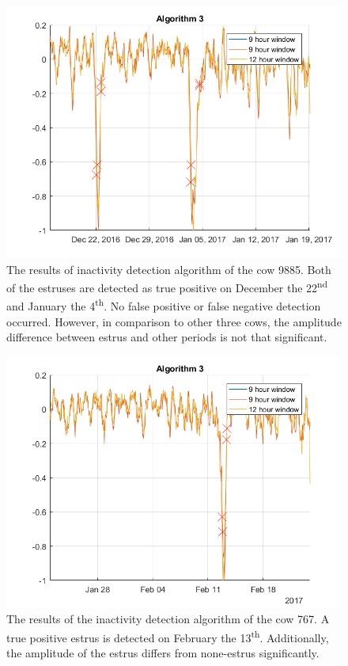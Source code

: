 \documentclass[english,12pt,a4paper,pdftex,elec,utf8]{aaltothesis}
\begin{document}
\begin{figure}[htb]
\centering
\includegraphics[width = 0.75 \textwidth]{figures/algorithm3_cow9885.png}
\caption{The results of inactivity detection algorithm of the cow 9885. Both of the estruses are detected as true positive on December the 22\textsuperscript{nd} and January the 4\textsuperscript{th}. No false positive or false negative detection occurred. However, in comparison to other three cows, the amplitude difference between estrus and other periods is not that significant.}
\end{figure}




\begin{figure}[htb]
\centering
\includegraphics[width = 0.75 \textwidth]{figures/algorithm3_cow767.png}
\caption{The results of the inactivity detection algorithm of the cow 767. A true positive estrus is detected on February the 13\textsuperscript{th}. Additionally, the amplitude of the estrus differs from none-estrus significantly.}
\end{figure}
\end{document}
